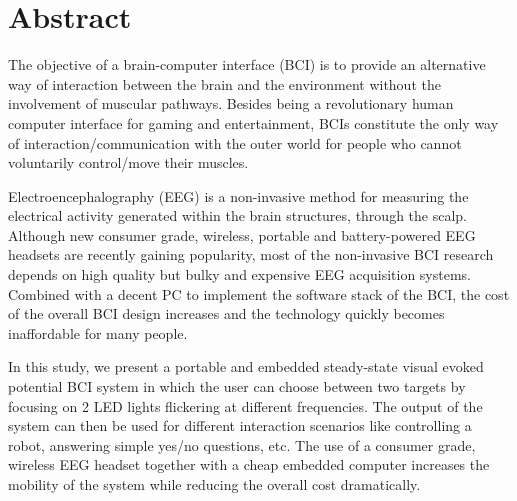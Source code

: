 \documentclass[12pt]{article}
\numberwithin{equation}{section}
\numberwithin{figure}{section}
\numberwithin{table}{section}
\begin{document}
\renewcommand\listfigurename{\normalsize\bfseries List of Figures}
\thispagestyle{empty}
\vspace*{0.15cm}
\listoffigures
\clearpage

\renewcommand\listtablename{\normalsize\bfseries List of Tables}
\thispagestyle{empty}
\vspace*{0.15cm}
\listoftables
\clearpage

\vspace*{-0.35cm}
\thispagestyle{empty}
\section*{Abstract}
\vspace*{6pt}

\par{
    The objective of a brain-computer interface (BCI) is to provide an alternative way of interaction between the brain and the environment
    without the involvement of muscular pathways. Besides being a revolutionary human computer interface for gaming and entertainment,
    BCIs constitute the only way of interaction/communication with the outer world for people who cannot voluntarily control/move their muscles.
}
\par{
    Electroencephalography (EEG) is a non-invasive method for measuring the electrical activity generated within the brain structures, through the scalp.
    Although new consumer grade, wireless, portable and battery-powered EEG headsets are recently gaining popularity,
    most of the non-invasive BCI research depends on high quality but bulky and expensive EEG acquisition systems.
    Combined with a decent PC to implement the software stack of the BCI, the cost of the overall
    BCI design increases and the technology quickly becomes inaffordable for many people.
}
\par{
    In this study, we present a portable and embedded steady-state visual evoked potential BCI
    system in which the user can choose between two targets by focusing on 2 LED lights flickering
    at different frequencies. The output of the system can then be used for different
    interaction scenarios like controlling a robot, answering simple yes/no questions, etc.
    The use of a consumer grade, wireless EEG headset together with a cheap embedded computer
    increases the mobility of the system while reducing the overall cost dramatically.
}
\end{document}
